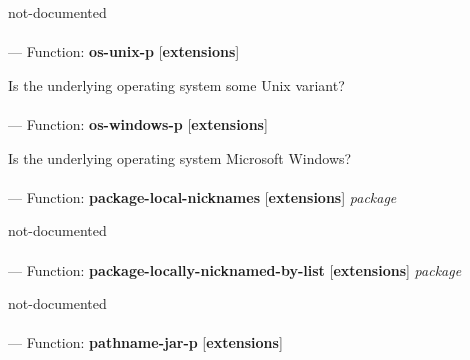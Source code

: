 \begin{adjustwidth}{5em}{5em}
not-documented
\end{adjustwidth}

\paragraph{}
\label{EXTENSIONS:OS-UNIX-P}
--- Function: \textbf{os-unix-p} [\textbf{extensions}] \textit{}

\begin{adjustwidth}{5em}{5em}
Is the underlying operating system some Unix variant?
\end{adjustwidth}

\paragraph{}
\label{EXTENSIONS:OS-WINDOWS-P}
--- Function: \textbf{os-windows-p} [\textbf{extensions}] \textit{}

\begin{adjustwidth}{5em}{5em}
Is the underlying operating system Microsoft Windows?
\end{adjustwidth}

\paragraph{}
\label{EXTENSIONS:PACKAGE-LOCAL-NICKNAMES}
--- Function: \textbf{package-local-nicknames} [\textbf{extensions}] \textit{package}

\begin{adjustwidth}{5em}{5em}
not-documented
\end{adjustwidth}

\paragraph{}
\label{EXTENSIONS:PACKAGE-LOCALLY-NICKNAMED-BY-LIST}
--- Function: \textbf{package-locally-nicknamed-by-list} [\textbf{extensions}] \textit{package}

\begin{adjustwidth}{5em}{5em}
not-documented
\end{adjustwidth}

\paragraph{}
\label{EXTENSIONS:PATHNAME-JAR-P}
--- Function: \textbf{pathname-jar-p} [\textbf{extensions}] \textit{}

